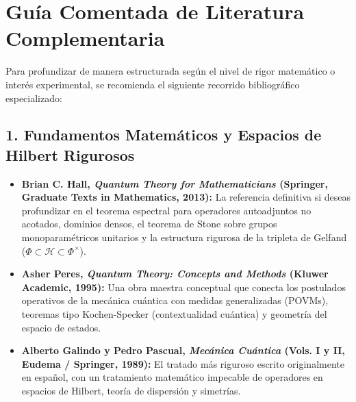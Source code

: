 \documentclass[11pt,a4paper]{book}
\begin{document}
\chapter*{Guía Comentada de Literatura Complementaria}

Para profundizar de manera estructurada según el nivel de rigor matemático o interés experimental, se recomienda el siguiente recorrido bibliográfico especializado:

\section*{1. Fundamentos Matemáticos y Espacios de Hilbert Rigurosos}
\begin{itemize}
    \item \textbf{Brian C. Hall, \textit{Quantum Theory for Mathematicians} (Springer, Graduate Texts in Mathematics, 2013):} La referencia definitiva si deseas profundizar en el teorema espectral para operadores autoadjuntos no acotados, dominios densos, el teorema de Stone sobre grupos monoparamétricos unitarios y la estructura rigurosa de la tripleta de Gelfand ($\Phi \subset \mathcal{H} \subset \Phi^\times$).
    \item \textbf{Asher Peres, \textit{Quantum Theory: Concepts and Methods} (Kluwer Academic, 1995):} Una obra maestra conceptual que conecta los postulados operativos de la mecánica cuántica con medidas generalizadas (POVMs), teoremas tipo Kochen-Specker (contextualidad cuántica) y geometría del espacio de estados.
    \item \textbf{Alberto Galindo y Pedro Pascual, \textit{Mecánica Cuántica} (Vols. I y II, Eudema / Springer, 1989):} El tratado más riguroso escrito originalmente en español, con un tratamiento matemático impecable de operadores en espacios de Hilbert, teoría de dispersión y simetrías.
\end{itemize}
\end{document}
